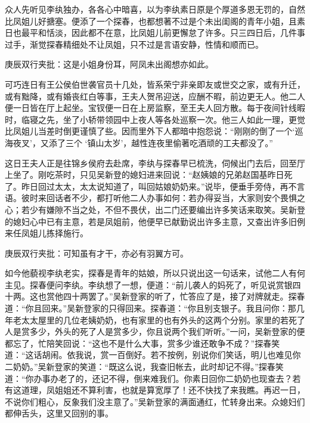 \begin{parag}


    众人先听见李纨独办，各各心中暗喜，以为李纨素日原是个厚道多恩无罚的，自然比凤姐儿好搪塞。便添了一个探春，也都想著不过是个未出闺阁的青年小姐，且素日也最平和恬淡，因此都不在意，比凤姐儿前更懈怠了许多。只三四日后，几件事过手，渐觉探春精细处不让凤姐，只不过是言语安静，性情和顺而已。\begin{note}庚辰双行夹批：这是小姐身份耳，阿凤未出阁想亦如此。\end{note}可巧连日有王公侯伯世袭官员十几处，皆系荣宁非亲即友或世交之家，或有升迁，或有黜降，或有婚丧红白等事，王夫人贺吊迎送，应酬不暇，前边更无人。他二人便一日皆在厅上起坐。宝钗便一日在上房监察，至王夫人回方散。每于夜间针线暇时，临寝之先，坐了小轿带领园中上夜人等各处巡察一次。他三人如此一理，更觉比凤姐儿当差时倒更谨慎了些。因而里外下人都暗中抱怨说：“刚刚的倒了一个‘巡海夜叉’，又添了三个 ‘镇山太岁’，越性连夜里偷著吃酒顽的工夫都没了。”
\end{parag}


\begin{parag}


    这日王夫人正是往锦乡侯府去赴席，李纨与探春早已梳洗，伺候出门去后，回至厅上坐了。刚吃茶时，只见吴新登的媳妇进来回说：“赵姨娘的兄弟赵国基昨日死了。昨日回过太太，太太说知道了，叫回姑娘奶奶来。”说毕，便垂手旁侍，再不言语。彼时来回话者不少，都打听他二人办事如何：若办得妥当，大家则安个畏惧之心；若少有嫌隙不当之处，不但不畏伏，出二门还要编出许多笑话来取笑。吴新登的媳妇心中已有主意，若是凤姐前，他便早已献勤说出许多主意，又查出许多旧例来任凤姐儿拣择施行。\begin{note}庚辰双行夹批：可知虽有才干，亦必有羽翼方可。\end{note}如今他藐视李纨老实，探春是青年的姑娘，所以只说出这一句话来，试他二人有何主见。探春便问李纨。李纨想了一想，便道：“前儿袭人的妈死了，听见说赏银四十两。这也赏他四十两罢了。”吴新登家的听了，忙答应了是，接了对牌就走。探春道：“你且回来。”吴新登家的只得回来。探春道：“你且别支银子。我且问你：那几年老太太屋里的几位老姨奶奶，也有家里的也有外头的这两个分别。家里的若死了人是赏多少，外头的死了人是赏多少，你且说两个我们听听。”一问，吴新登家的便都忘了，忙陪笑回说：“这也不是什么大事，赏多少谁还敢争不成？”探春笑道：“这话胡闹。依我说，赏一百倒好。若不按例，别说你们笑话，明儿也难见你二奶奶。”吴新登家的笑道：“既这么说，我查旧帐去，此时却记不得。”探春笑道：“你办事办老了的，还记不得，倒来难我们。你素日回你二奶奶也现查去？若有这道理，凤姐姐还不算利害，也就是算宽厚了！还不快找了来我瞧。再迟一日，不说你们粗心，反象我们没主意了。”吴新登家的满面通红，忙转身出来。众媳妇们都伸舌头，这里又回别的事。
\end{parag}


